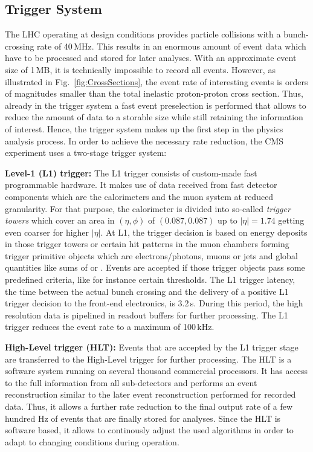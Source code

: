 \subsection{Trigger System}
\label{subsec:cms_trigger}
The LHC operating at design conditions provides particle collisions with a bunch-crossing rate of 40\,MHz. This results in an enormous amount of event data which have to be processed and stored for later analyses. With an approximate event size of 1\,MB, it is technically impossible to record all events. However, as illustrated in Fig.~\ref{fig:CrossSections}, the event rate of interesting events is orders of magnitudes smaller than the total inelastic proton-proton cross section. Thus, already in the trigger system a fast event preselection is performed that allows to reduce the amount of data to a storable size while still retaining the information of interest. Hence, the trigger system makes up the first step in the physics analysis process. In order to achieve the necessary rate reduction, the CMS experiment uses a two-stage trigger system:
\begin{description}
\item \textbf{Level-1 (L1) trigger:} The L1 trigger consists of custom-made fast programmable hardware. It makes use of data received from fast detector components which are the calorimeters and the muon system at reduced granularity. For that purpose, the calorimeter is divided into so-called \textit{trigger towers} which cover an area in $(\eta, \phi)$ of $(0.087, 0.087)$ up to $|\eta| = 1.74$ getting even coarser for higher $|\eta|$. At L1, the trigger decision is based on energy deposits in those trigger towers or certain hit patterns in the muon chambers forming trigger primitive objects which are electrons/photons, muons or jets and global quantities like sums of \et or \met. Events are accepted if those trigger objects pass some predefined criteria, like for instance certain \pt thresholds. The L1 trigger latency, \ie the time between the actual bunch crossing and the delivery of a positive L1 trigger decision to the front-end electronics, is 3.2\,\textmu s. During this period, the high resolution data is pipelined in readout buffers for further processing. The L1 trigger reduces the event rate to a maximum of 100\,kHz.
\item \textbf{High-Level trigger (HLT):} Events that are accepted by the L1 trigger stage are transferred to the High-Level trigger for further processing. The HLT is a software system running on several thousand commercial processors. It has access to the full information from all sub-detectors and performs an event reconstruction similar to the later event reconstruction performed for recorded data. Thus, it allows a further rate reduction to the final output rate of a few hundred Hz of events that are finally stored for analyses. Since the HLT is software based, it allows to continously adjust the used algorithms in order to adapt to changing conditions during operation.
\end{description}

